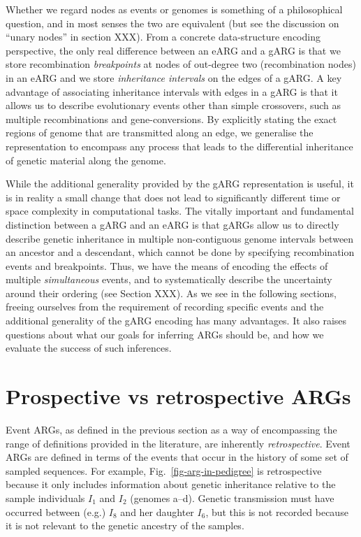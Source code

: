 \documentclass{article}
\begin{document}
Whether we regard nodes as events or genomes is something of a
philosophical question, and in most senses the two are equivalent
(but see the discussion on ``unary nodes'' in section XXX).
From a concrete data-structure encoding perspective, the only real
difference between an eARG and a gARG is that we store recombination
\emph{breakpoints} at nodes of out-degree two (recombination nodes)
in an eARG and we store \emph{inheritance intervals} on the edges
of a gARG. A key advantage of associating inheritance intervals with
edges in a gARG is that it allows us to describe evolutionary events other
than simple crossovers, such as multiple recombinations and
gene-conversions. By explicitly stating the exact regions of genome
that are transmitted along an edge, we generalise the representation
to encompass any process that leads to the differential inheritance of
genetic material along the genome.

While the additional generality provided by the gARG representation
is useful, it is in reality a small change that does not
lead to significantly different time or space complexity in computational
tasks.
The vitally important and fundamental distinction between
a gARG and an eARG is that gARGs
allow us to directly describe
genetic inheritance in multiple non-contiguous genome intervals
between an ancestor and a descendant, which cannot be done
by specifying recombination events and breakpoints.
Thus, we have the means of encoding the effects of
multiple \emph{simultaneous} events, and to
systematically describe the uncertainty around their
ordering (see Section XXX).
As we see in the following sections, freeing ourselves from the requirement
of recording specific events and
the additional generality of the gARG encoding
has many advantages. It also raises questions about what our goals
for inferring ARGs should be, and how we evaluate the success
of such inferences.

\section*{Prospective vs retrospective ARGs}
Event ARGs, as defined in the previous section as a way of encompassing
the range of definitions provided in the literature, are
inherently \emph{retrospective}.
Event ARGs are defined in terms
of the events that occur in the history of some set of sampled
sequences.
For example, Fig.~\ref{fig-arg-in-pedigree}
is retrospective because it only includes information
about genetic inheritance relative to the sample individuals
$I_1$ and $I_2$ (genomes \textsf{a}--\textsf{d}).
Genetic transmission must have occurred between (e.g.)
$I_8$ and her daughter $I_6$, but this is not recorded because
it is not relevant to the genetic ancestry of the samples.
\end{document}
